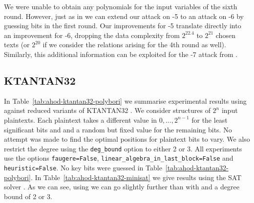 We were unable to obtain any polynomials for the input variables of the sixth round. However, just as in \cite{bit-pattern-ia} we can extend our attack on -5 to an attack on -6 by guessing bits in the first round. Our improvements for -5 translate directly into an improvement for -6, dropping the data complexity from $2^{22.4}$ to $2^{21}$  chosen texts (or $2^{20}$ if we consider the relations arising for the 4th round as well). Similarly, this additional information can be exploited for the -7 attack from \cite{bit-pattern-ia}.

\subsection{KTANTAN32}

In Table~\ref{tab:ahod-ktantan32-polybori} we summarise experimental results using \PolyBoRi against reduced variants of KTANTAN32 \cite{CDK09}. We consider structures of $2^n$ input plaintexts. Each plaintext takes a different value in $0,\dots,2^{n-1}$ for the least significant bits and and a random but fixed value for the remaining bits. No attempt was made to find the optimal positions for plaintext bits to vary. We also restrict the degree using the \texttt{deg\_bound} option to either 2 or 3. All experiments use the \PolyBoRi options  \texttt{faugere=False}, \texttt{linear\_al\-gebra\_in\_last\_block=False} and \texttt{heuristic=False}. No key bits were guessed in Table~\ref{tab:ahod-ktantan32-polybori}. In Table~\ref{tab:ahod-ktantan32-minisat} we give results using the SAT solver \MiniSat. As we can see, using \MiniSat we can go slightly further than with \PolyBoRi and a degree bound of 2 or 3.

